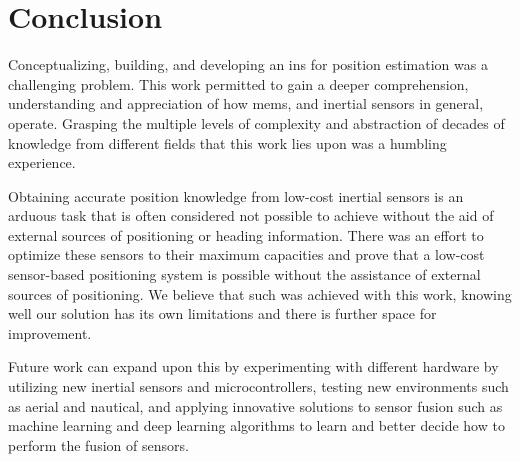 \section{Conclusion}
Conceptualizing, building, and developing an \acrfull{ins} for position estimation was a challenging problem. This work permitted to gain a deeper comprehension, understanding and appreciation of how \acrfull{mems}, and inertial sensors in general, operate. Grasping the multiple levels of complexity and abstraction of decades of knowledge from different fields that this work lies upon was a humbling experience.

Obtaining accurate position knowledge from low-cost inertial sensors is an arduous task that is often considered not possible to achieve without the aid of external sources of positioning or heading information. There was an effort to optimize these sensors to their maximum capacities and prove that a low-cost sensor-based positioning system is possible without the assistance of external sources of positioning. We believe that such was achieved with this work, knowing well our solution has its own limitations and there is further space for improvement.

Future work can expand upon this by experimenting with different hardware by utilizing new inertial sensors and microcontrollers, testing new environments such as aerial and nautical, and applying innovative solutions to sensor fusion such as machine learning and deep learning algorithms to learn and better decide how to perform the fusion of sensors.